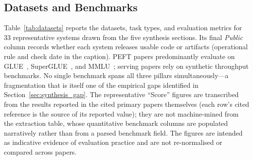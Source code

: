 \subsection{Datasets and Benchmarks}
\label{sec:methodology:datasets}

Table~\ref{tab:datasets} reports the datasets, task types, and evaluation
metrics for 33 representative systems drawn from the five synthesis sections.
Its final \emph{Public} column records whether each system releases usable code
or artifacts (operational rule and check date in the caption).
PEFT papers predominantly evaluate on GLUE~\cite{WangGLUE2018},
SuperGLUE~\cite{WangSuperGLUE2019}, and MMLU~\cite{HendrycksMMLU2021};
serving papers rely on synthetic throughput benchmarks. No single benchmark
spans all three pillars simultaneously---a fragmentation that is itself one
of the empirical gaps identified in Section~\ref{sec:synthesis_gap}. The
representative ``Score'' figures are transcribed from the results reported in
the cited primary papers themselves (each row's cited reference is the source
of its reported value); they are not machine-mined from the extraction table,
whose quantitative benchmark columns are populated narratively rather than
from a parsed benchmark field. The figures are intended as indicative evidence
of evaluation practice and are not re-normalised or compared across papers.

